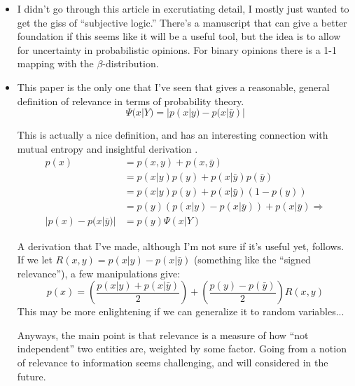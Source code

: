 \documentclass{article}
\begin{document}

\begin{itemize}

    \item I didn't go through this article in excrutiating detail, I mostly just wanted to get the giss of ``subjective logic.''  There's a manuscript that can give a better foundation if this seems like it will be a useful tool, but the idea is to allow for uncertainty in probabilistic opinions.  For binary opinions there is a 1-1 mapping with the $\beta$-distribution.

    \item {}  This paper is the only one that I've seen that gives a reasonable, general definition of relevance in terms of probability theory.
    \[ \Psi(x|Y) = |p(x|y) - p(x|\bar y)| \]

    This is actually a nice definition, and has an interesting connection with mutual entropy and insightful derivation .
    \begin{align*}
    p(x) & = p(x,y) + p(x,\bar y) \\
         & = p(x|y)p(y) + p(x|\bar y)p(\bar y) \\
         & = p(x|y)p(y) + p(x|\bar y)(1-p(y)) \\
         & = p(y)(p(x|y) - p(x|\bar y)) + p(x|\bar y) \Rightarrow \\
    |p(x) - p(x|\bar y)| & = p(y)\Psi(x|Y)
    \end{align*}

    A derivation that I've made, although I'm not sure if it's useful yet, follows.  If we let $R(x,y) = p(x|y)-p(x|\bar y)$ (something like the ``signed relevance''), a few manipulations give:
    \[ p(x) = \left(\frac{p(x|y) + p(x|\bar y)}{2}\right) + \left(\frac{p(y)-p(\bar y)}{2}\right)R(x,y) \]
    This may be more enlightening if we can generalize it to random variables...

    Anyways, the main point is that relevance is a measure of how ``not independent'' two entities are, weighted by some factor.  Going from a notion of relevance to information seems challenging, and will considered in the future.


\end{itemize}

%
\end{document}
